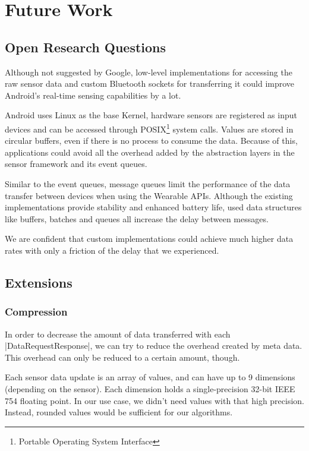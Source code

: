 \section{Future Work}
\label{sec:futurework}

\subsection{Open Research Questions}
Although not suggested by Google, low-level implementations for accessing the raw sensor data and custom Bluetooth sockets for transferring it could improve Android's real-time sensing capabilities by a lot.

Android uses Linux as the base Kernel, hardware sensors are registered as input devices and can be accessed through POSIX\footnote{Portable Operating System Interface} system calls. Values are stored in circular buffers, even if there is no process to consume the data.
Because of this, applications could avoid all the overhead added by the abstraction layers in the sensor framework and its event queues.

Similar to the event queues, message queues limit the performance of the data transfer between devices when using the Wearable APIs.
Although the existing implementations provide stability and enhanced battery life, used data structures like buffers, batches and queues all increase the delay between messages.

We are confident that custom implementations could achieve much higher data rates with only a friction of the delay that we experienced.

\clearpage

\subsection{Extensions}

\subsubsection{Compression}
In order to decrease the amount of data transferred with each \\|DataRequestResponse|\cite{sensordatalogger:datarequestresponse}, we can try to reduce the overhead created by meta data.
This overhead can only be reduced to a certain amount, though.

Each sensor data update is an array of values, and can have up to 9 dimensions (depending on the sensor).
Each dimension holds a single-precision 32-bit IEEE 754 floating point.
In our use case, we didn't need values with that high precision.
Instead, rounded values would be sufficient for our algorithms.

